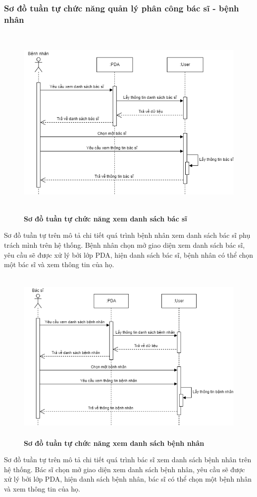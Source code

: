 \subsubsection{Sơ đồ tuần tự chức năng quản lý phân công bác sĩ - bệnh nhân}
\begin{figure}[H]
  \centering
  \includegraphics[width=13cm,height=9.5cm]{Images/sequence/sequence_manage_doctor.png}
  \caption[Sơ đồ tuần tự chức năng xem danh sách bác sĩ]{\bfseries \fontsize{12pt}{0pt}
  \selectfont Sơ đồ tuần tự chức năng xem danh sách bác sĩ}
  \label{sequence_manage_doctor} %
\end{figure}
Sơ đồ tuần tự trên mô tả chi tiết quá trình bệnh nhân xem danh sách bác sĩ phụ trách mình trên hệ thống. Bệnh nhân chọn mở giao diện xem danh sách bác sĩ, 
yêu cầu sẽ được xử lý bởi lớp PDA, hiện danh sách bác sĩ, bệnh nhân có thể chọn một bác sĩ và xem thông tin của họ. 
\begin{figure}[H]
  \centering
  \includegraphics[width=12cm,height=8.5cm]{Images/sequence/sequence_manage_patient.png}
  \caption[Sơ đồ tuần tự chức năng xem danh sách bệnh nhân]{\bfseries \fontsize{12pt}{0pt}
  \selectfont Sơ đồ tuần tự chức năng xem danh sách bệnh nhân}
  \label{sequence_manage_patient} %
\end{figure}
Sơ đồ tuần tự trên mô tả chi tiết quá trình bác sĩ xem danh sách bệnh nhân trên hệ thống. Bác sĩ chọn mở giao diện xem danh sách bệnh nhân, 
yêu cầu sẽ được xử lý bởi lớp PDA, hiện danh sách bệnh nhân, bác sĩ có thể chọn một bệnh nhân và xem thông tin của họ. 

